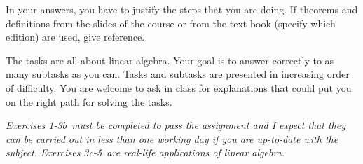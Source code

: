 \documentclass[a4paper,10pt]{article}
\begin{document}
\medskip
In your answers, you have to justify the steps that you are doing. If
theorems and definitions from the slides of the course or from the text
book (specify which edition) are used, give reference.


\medskip
The tasks are all about linear algebra. Your goal is to answer correctly
to as many subtasks as you can. Tasks and subtasks are presented in
increasing order of difficulty. You are welcome to ask in class for
explanations that could put you on the right path for solving the tasks.

\medskip
\emph{Exercises \color{red}1-3b\color{black}\ must be completed to pass the assignment and I
  expect that they can be carried out in less than one working day if
  you are up-to-date with the subject. Exercises \color{red}3c-5\color{black}\ are real-life
  applications of linear algebra.  }



\clearpage


\end{document}
